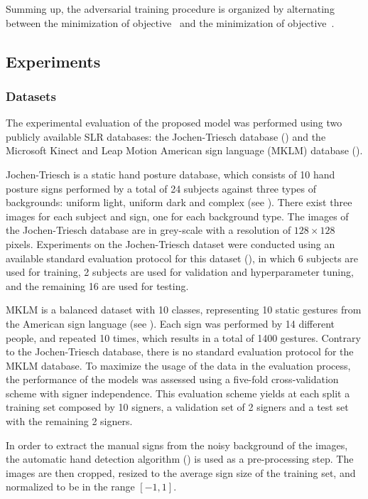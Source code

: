 Summing up, the adversarial training procedure is organized by alternating between the minimization of objective~ and the minimization of objective~.

\subsection{Experiments}
\label{sec:adv_signer_inv_experiments}

\subsubsection{Datasets}
The experimental evaluation of the proposed model was performed using two publicly available SLR databases: the Jochen-Triesch database (\citet{Triesch2001}) and the Microsoft Kinect and Leap Motion American sign language (MKLM) database (\citet{Marin2014, Marin2016}).

Jochen-Triesch is a static hand posture database, which consists of 10 hand posture signs performed by a total of 24 subjects against three types of backgrounds: uniform light, uniform dark and complex (see ). There exist three images for each subject and sign, one for each background type. The images of the Jochen-Triesch database are in grey-scale with a resolution of $128\times 128$ pixels. Experiments on the Jochen-Triesch dataset were conducted using an available standard evaluation protocol for this dataset (\citet{Just2006}), in which 6 subjects are used for training, 2 subjects are used for validation and hyperparameter tuning, and the remaining 16 are used for testing.

MKLM is a balanced dataset with 10 classes, representing 10 static gestures from the American sign language (see ). Each sign was performed by 14 different people, and repeated 10 times, which results in a total of 1400 gestures. Contrary to the Jochen-Triesch database, there is no standard evaluation protocol for the MKLM database. To maximize the usage of the data in the evaluation process, the performance of the models was assessed using a five-fold cross-validation  scheme with signer independence. This evaluation scheme yields at each split a training set composed by 10 signers, a validation set of 2 signers and a test set with the remaining 2 signers.

In order to extract the manual signs from the noisy background of the images, the automatic hand detection algorithm (\citet{Ferreira2018}) is used as a pre-processing step. The images are then cropped, resized to the average sign size of the training set, and normalized to be in the range $[-1,1]$.

